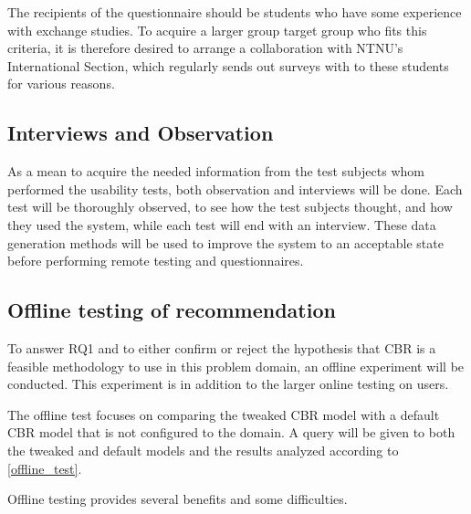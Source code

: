 The recipients of the questionnaire should be students who have some experience with exchange studies. To acquire a larger group target group who fits this criteria, it is therefore desired to arrange a collaboration with NTNU's International Section, which regularly sends out surveys with to these students for various reasons.


\subsection{Interviews and Observation}

As a mean to acquire the needed information from the test subjects whom performed the usability tests, both observation and interviews will be done. Each test will be thoroughly observed, to see how the test subjects thought, and how they used the system, while each test will end with an interview. These data generation methods will be used to improve the system to an acceptable state before performing remote testing and questionnaires.

\subsection{Offline testing of recommendation}

To answer RQ1 and to either confirm or reject the hypothesis that CBR is a feasible methodology to use in this problem domain, an offline experiment will be conducted. This experiment is in addition to the larger online testing on users. 

The offline test focuses on comparing the tweaked CBR model with a default CBR model that is not configured to the domain. A query will be given to both the tweaked and default models and the results analyzed according to \ref{offline_test}.

Offline testing provides several benefits and some difficulties. 

